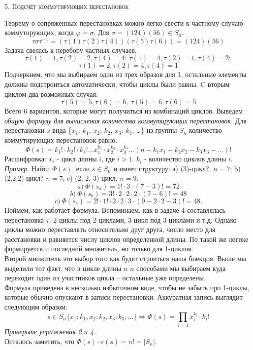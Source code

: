 \documentclass[a4paper,12pt]{article}
\begin{document}
\newpage
\begin{center}
    \textsc{5. Подсчёт коммутирующих перестановок}
\end{center}
Теорему о сопряженных перестановках можно легко свести к частному случаю коммутирующих, когда $\varphi = \sigma$. Для $\sigma = (124)(56) \in S_6$. 
\[\tau \sigma \tau^{-1} = (\tau(1)\tau(2)\tau(4))(\tau(5)\tau(6)) = (124)(56) \]
Задача свелась к перебору частных случаев. 
\[ \tau(1) = 1, \tau(2) = 2, \tau(4) = 4; \ \tau(1) = 4, \tau(2) = 1, \tau(4) = 2; \]
\[ \tau(1) = 2, \tau(2) = 4, \tau(4) = 1 \]
Подчеркнем, что мы выбираем один из трех образов для 1, остальные элементы должны подстроиться автоматически, чтобы циклы были равны. C вторым циклом два возможных случая:
\[ \tau(5) = 5, \tau(6) = 6, \ \tau(5) = 6, \tau(6) = 5\]
Всего 6 вариантов, которые могут получиться из комбинаций циклов. Выведем \textit{общую формулу для вычисления количества коммутирующих перестановок.} 
Для перестановки $s$ вида \{$x_1$: $k_1$, $x_2$: $k_2$, $x_3$: $k_3$, \dots \} из группы $S_n$ количество коммутирующих перестановок равно:
\[\Phi(s) = k_1! \cdot k_2! \cdot k_3! \dots x_1^{k_1}\cdot x_2^{k_2} \cdot x_3^{k_3} \dots  (n - k_1x_1 - k_2x_2 - k_3x_3 - \dots)!\]
Расшифровка: $x_i$ - цикл длины $i$, где $i > 1$. $k_i$ - количество циклов длины $i$. \\
\textit{Пример}. Найти $\Phi(s)$, если $s \in S_n$ и имеет структуру: а) (3)-цикл?, $n = 7$; b) (2,2,2)-цикл? $n = 7$; c) (2, 2, 3)-цикл, $n = 9$. 
\[a) \ \Phi(s_a) = 1!\cdot 3 \cdot (7-3)! = 72\]
\[b) \ \Phi(s_b) = 3! \cdot 2 \cdot 2 \cdot 2 \cdot (7-6)! = 48\]
\[c) \ \Phi(s_c) = 2! \cdot 1!\cdot 2 \cdot 2 \cdot 3 \cdot (9-2\cdot 2 - 3)! = 48.\] 
Поймем, как работает формула. Вспоминаем, как в задаче 4 составлялась перестановка $\tau$: 2-циклы под 2-циклами, 3-цикл под 3-циклами и т.д. Однако циклы можно переставлять относительно друг друга, число место для расстановки и равняется числу циклов определенной длины. По такой же логике формируется и последний множитель, но только для 1-циклов. \\
Второй множитель это выбор того как будет строиться наша биекция. Выше мы выделили тот факт, что в цикле длины $n$ $n$ способами мы выбираем куда переходит один из участников цикла -- остальные уже определены. \\
Формула приведена в несколько избыточном виде, чтобы не забыть про 1-циклы, которые обычно опускают в записи перестановки. Аккуратная запись выглядит следующим образом:
\[s \in S_n \{x_1: k_1, x_2: k_2, x_3: k_3, \dots \} \Rightarrow \boxed{\Phi(s) = \prod_{i=1} x_i^{k_i} \cdot k_i!}\]
\textit{Проверьте упражнения 2 и 4.} \\ 
Осталось заметить, что $\Phi(s) \cdot \varepsilon(s) = n! = |S_n|$. 
\end{document}
